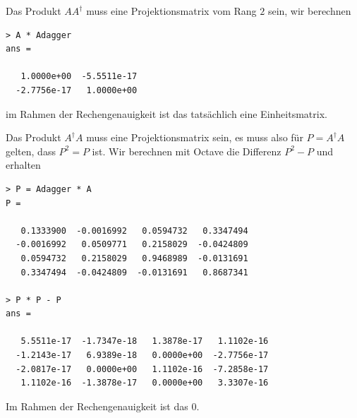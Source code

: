 \begin{beispiel}
\begin{verbatim}
\end{verbatim}
Das Produkt $AA^\dagger$ muss eine Projektionsmatrix vom Rang $2$ sein, wir
berechnen
\begin{verbatim}
> A * Adagger
ans =

   1.0000e+00  -5.5511e-17
  -2.7756e-17   1.0000e+00
\end{verbatim}
im Rahmen der Rechengenauigkeit ist das tatsächlich eine Einheitsmatrix.

Das Produkt $A^\dagger A$ muss eine Projektionsmatrix sein, es muss also
für $P=A^\dagger A$ gelten, dass $P^2=P$ ist.
Wir berechnen mit Octave die Differenz $P^2-P$ und erhalten
\begin{verbatim}
> P = Adagger * A
P =

   0.1333900  -0.0016992   0.0594732   0.3347494
  -0.0016992   0.0509771   0.2158029  -0.0424809
   0.0594732   0.2158029   0.9468989  -0.0131691
   0.3347494  -0.0424809  -0.0131691   0.8687341

> P * P - P
ans =

   5.5511e-17  -1.7347e-18   1.3878e-17   1.1102e-16
  -1.2143e-17   6.9389e-18   0.0000e+00  -2.7756e-17
  -2.0817e-17   0.0000e+00   1.1102e-16  -7.2858e-17
   1.1102e-16  -1.3878e-17   0.0000e+00   3.3307e-16
\end{verbatim}
Im Rahmen der Rechengenauigkeit ist das $0$.
\end{beispiel}
